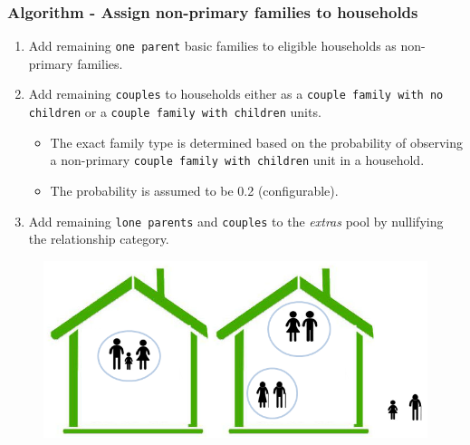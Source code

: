 \begin{frame}%
  \frametitle{Algorithm - Assign non-primary families to households}
  \begin{enumerate}
  	\conti
    \setlength\itemsep{1em}%
    \item Add remaining \texttt{one parent} basic families to eligible 
    households as non-primary families.%
    \item Add remaining \texttt{couples} to households either as a 
    \texttt{couple family with no children} or a \texttt{couple family with 
    children} units.\label{non-prime-cpl-with-child}\\[2pt]%
    \begin{itemize}%
    	\setlength\itemsep{1em}%
    	\item The exact family type is determined based on the probability of
    	observing a non-primary \texttt{couple family with children} unit in a 
    	household.%
    	\item The probability is assumed to be 0.2 (configurable).%
    \end{itemize}%
    \item Add remaining \texttt{lone parents} and \texttt{couples} to the
    \textit{extras} pool by nullifying the relationship category.
    \seti%
  \end{enumerate}%
  \begin{figure}
    \centering
    \includegraphics[scale=0.4]{images/add-non-prime}
  \end{figure}
\end{frame}%

